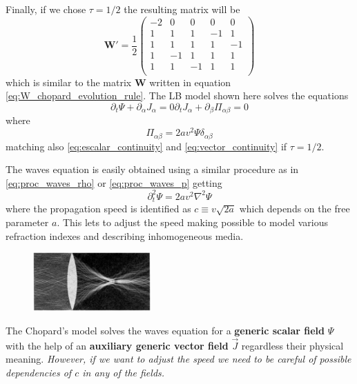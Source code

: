 Finally, if we chose $\tau=1/2$ the resulting matrix will be
\begin{equation}
    \bm{W'} = \frac{1}{2}\begin{pmatrix}
        -2 & 0 & 0 & 0 & 0 \\
        1 & 1 & 1 & -1 & 1 \\
        1 & 1 & 1 & 1 & -1 \\
        1 & -1 & 1 & 1 & 1 \\
        1 & 1 & -1 & 1 & 1 \\
    \end{pmatrix}
\end{equation}
which is similar to the matrix $\bm{W}$ written in equation \ref{eq:W_chopard_evolution_rule}. The LB model shown here solves the equations
\begin{subequations}
\begin{equation}
    \partial_t \Psi + \partial_\alpha J_\alpha = 0
\end{equation}
\begin{equation}
    \partial_t J_\alpha + \partial_\beta\Pi_{\alpha\beta} = 0
\end{equation}
\end{subequations}
where
\begin{equation}
    \Pi_{\alpha\beta} = 2av^2\Psi\delta_{\alpha\beta}
\end{equation}
matching also \ref{eq:escalar_continuity} and \ref{eq:vector_continuity} if $\tau=1/2$. 

The waves equation is easily obtained using a similar procedure as in \ref{eq:proc_waves_rho} or \ref{eq:proc_waves_p} getting
\begin{equation}
    \partial_t^2\Psi = 2av^2\nabla^2\Psi
\end{equation}
where the propagation speed is identified as $c\equiv v\sqrt{2a}$ which depends on the free parameter $a$. This lets to adjust the speed making possible to model various refraction indexes and describing inhomogeneous media. 
\begin{figure}
    \centering
    \includegraphics[width=0.4\textwidth]{images/LB/lens_LB_chopard.png}
    \label{fig:lens}
\end{figure}
The Chopard's model solves the waves equation for a \textbf{generic scalar field} $\Psi$ with the help of an \textbf{auxiliary generic vector field} $\vec J$ regardless their physical meaning. \textit{However, if we want to adjust the speed we need to be careful of possible dependencies of $c$ in any of the fields.} 

